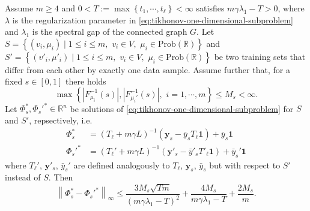 \documentclass[letterpaper]{article} %
\begin{document}
\begin{theorem}
  \label{thm:slice-algorithmic-stability}
  Assume $m\geq 4$ and $0<T:=\max \left\{ t_1,\cdots,t_{\ell} \right\}<\infty$ satisfies $m\gamma\lambda_1-T>0$, where $\lambda$ is the regularization parameter in \eqref{eq:tikhonov-one-dimensional-subproblem} and $\lambda_1$ is the spectral gap of the connected graph $G$. Let $S=\left\{ \left( v_i,\mu_i \right)\mid 1\leq i\leq m,\,\,v_i\in V,\,\,\mu_i\in\mathrm{Prob}\left( \mathbb{R} \right) \right\}$ and $S'=\left\{ \left( v'_i,\mu'_i \right)\mid 1\leq i\leq m,\,\,v_i\in V,\,\,\mu_i\in\mathrm{Prob}\left( \mathbb{R} \right) \right\}$ be two training sets that differ from each other by exactly one data sample. Assume further that, for a fixed $s\in \left[ 0,1 \right]$ there holds
  \begin{equation}
    \label{eq:quantile-boundedness}
    \max \left\{ \left|F_{\mu_i}^{-1} \left( s \right)\right|, \left|F_{\mu_i'}^{-1} \left( s \right)\right|,\,\,i=1,\cdots,m\right\}\leq M_s<\infty.
  \end{equation}
  Let $\Phi_s^{*},\Phi_s'^{*}\in\mathbb{R}^n$ be solutions of \eqref{eq:tikhonov-one-dimensional-subproblem} for $S$ and $S'$, repsectively, i.e.
  \begin{equation*}
    \begin{aligned}
      \Phi_s^{*}&=\left( T_{\ell}+m\gamma L \right)^{-1}\left(\mathbf{y}_s-\bar{y}_sT_\ell\mathbf{1}\right)+\bar{y}_s\mathbf{1}\\
      \Phi_s'^{*}&=\left( T_{\ell}'+m\gamma L \right)^{-1}\left(\mathbf{y}'_s-\bar{y}'_sT'_\ell\mathbf{1}\right)+\bar{y}_s'\mathbf{1}
    \end{aligned}
  \end{equation*}
  where $T_{\ell}'$, $\mathbf{y}'_s$, $\bar{y}_s'$ are defined analogously to $T_{\ell}$, $\mathbf{y}_s$, $\bar{y}_s$ but with respect to $S'$ instead of $S$. Then
  \begin{equation}
    \label{eq:slice-algorithmic-stability}
    \left\| \Phi_s^{*} -\Phi_s'^{*} \right\|_{\infty} \leq \frac{3M_s\sqrt{Tm}}{\left( m\gamma\lambda_1-T \right)^2}+\frac{4M_s}{m\gamma\lambda_1-T}+\frac{2M_s}{m}.
  \end{equation}
\end{theorem}
\end{document}
